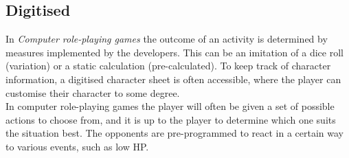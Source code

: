 \subsection*{Digitised}
In \emph{Computer role-playing games} the outcome of an activity is determined by measures implemented by the developers. This can be an imitation of a dice roll (variation) or a static calculation (pre-calculated).
To keep track of character information, a digitised character sheet is often accessible, where the player can customise their character to some degree.\\
In computer role-playing games the player will often be given a set of possible actions to choose from, and it is up to the player to determine which one suits the situation best. The opponents are pre-programmed to react in a certain way to various events, such as low HP.
\pagebreak

